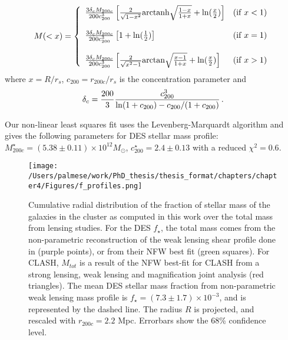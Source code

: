 {\begin{equation}
M(<x) = \left\{ \begin{array}{ll}
\frac{3 \delta_c M_{200c}}{200 c_{200}^3}
\left[\frac{2}{\sqrt{1-x^2}}{\rm arctanh}\sqrt{\frac{1-x}{1+x}}+ {\rm ln}(\frac{x}{2})
 \right] & ({\rm if }\;x < 1)\\
 & \\
\frac{3 \delta_c M_{200c}}{200 c_{200}^3}\left[ 1+{\rm ln}(\frac{1}{2})
 \right]  & ({\rm if }\;x = 1) \\
 & \\
\frac{3 \delta_c M_{200c}}{200 c_{200}^3}\left[\frac{2}{\sqrt{x^2-1}}{\rm arctan}\sqrt{\frac{x-1}{1+x}}+ {\rm ln}(\frac{x}{2}) \right]
& ({\rm if }\;x > 1)\\
\end{array}
\right.\label{2dmass}
\end{equation}
where $x=R/r_{s}$, $c_{200}=r_{200c}/r_s$ is the concentration parameter and 
\begin{equation}
\delta_c=\frac{200}{3}\frac{c_{200}^3}{{\rm ln}(1+c_{200})-c_{200}/(1+c_{200})}\,.
\end{equation}

Our non-linear least squares fit uses the Levenberg-Marquardt algorithm and gives the following parameters for DES stellar mass profile: $M_{200c}^\star= (5.38\pm 0.11)\times 10^{12} M_\odot$, $c_{200}^\star= 2.4  \pm 0.13 $ with a reduced $\chi ^2=0.6$.


\begin{figure}
\centering
\texttt{[image: /Users/palmese/work/PhD\_thesis/thesis\_format/chapters/chapter4/Figures/f\_profiles.png]}
\caption{Cumulative radial distribution of the fraction of stellar mass of the galaxies in the cluster as computed in this work over the total mass from lensing studies. For the DES $f_\star$, the total mass comes from the non-parametric reconstruction of the weak lensing shear profile done in \citealt{melchior} (purple points), or from their NFW best fit (green squares). For CLASH, $M_{tot}$ is a result of the \citet{umetsu15} NFW best-fit for CLASH from a strong lensing, weak lensing and magnification joint analysis (red triangles). The mean DES stellar mass fraction from non-parametric weak lensing mass profile is $f_\star=(7.3 \pm  1.7)\times10^{-3}$, and is represented by the dashed line. The radius $R$ is projected, and rescaled with $r_{200c}=2.2$ Mpc. Errorbars show the 68\% confidence level.}\label{f_profile}
\end{figure}

}
